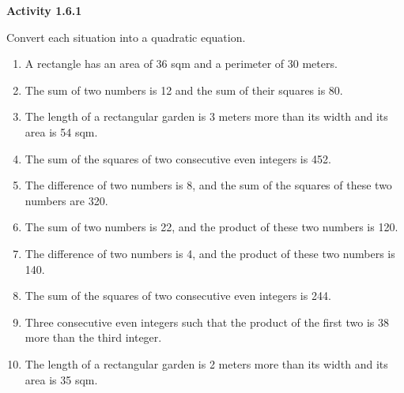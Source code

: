 \vspace{1ex}
\noindent\textbf{Activity 1.6.1}

\vspace{0.75ex}

Convert each situation into a quadratic equation.

\begin{enumerate}[label = \color{blue}\arabic*. ]
\item A rectangle has an area of 36 sqm and a perimeter of 30 meters. 
\item The sum of two numbers is 12 and the sum of their squares is 80.
\item The length of a rectangular garden is 3 meters more than its width and its area is 54 sqm.
\item The sum of the squares of two consecutive even integers is 452.
\item The difference of two numbers is 8, and the sum of the squares of these two numbers are 320.

\item The sum of two numbers is 22, and the product of these two numbers is 120.

\item The difference of two numbers is 4, and the product of these two numbers is 140.

\item The sum of the squares of two consecutive even integers is 244.

\item Three consecutive even integers such that the product of the first two is 38 more than the third integer. 

\item The length of a rectangular garden is 2 meters more than its width and its area is 35 sqm. 
\end{enumerate}





 

